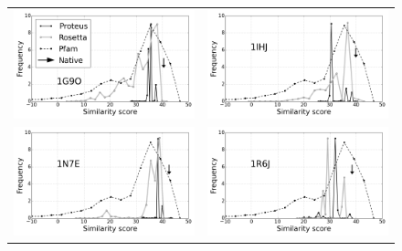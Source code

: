 \documentclass[a4paper,12pt]{article}
\begin{document}
   \begin{figure}[t]
     \centering
     \begin{tabular}{cc}
       \includegraphics[width=8.4cm]{rapport/resultats/PDZ/graphe/optGrad0/RP55/1G9O_core_simil.png} &
       \includegraphics[width=8.4cm]{rapport/resultats/PDZ/graphe/optGrad0/RP55/1IHJ_core_simil.png} \\
       \includegraphics[width=8.4cm]{rapport/resultats/PDZ/graphe/optGrad0/RP55/1N7E_core_simil.png} &
       \includegraphics[width=8.4cm]{rapport/resultats/PDZ/graphe/optGrad0/RP55/1R6J_core_simil.png} \\

\end{tabular}
\end{figure}
\end{document}
